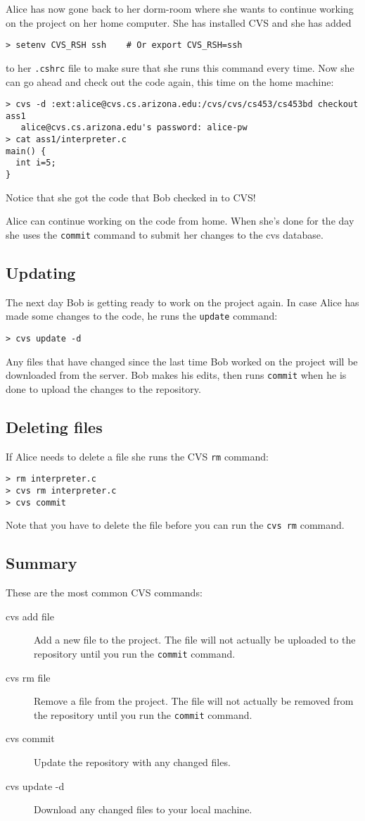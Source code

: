 Alice has now gone back to her dorm-room where she wants to
continue working on the project on her home computer. She
has installed CVS and she has added
\begin{verbatim}
> setenv CVS_RSH ssh    # Or export CVS_RSH=ssh
\end{verbatim}
to her {\tt .cshrc} file to make sure that she runs
this command every time. Now she can go ahead and
check out the code again, this time on the home 
machine: 
\begin{verbatim}
> cvs -d :ext:alice@cvs.cs.arizona.edu:/cvs/cvs/cs453/cs453bd checkout ass1
   alice@cvs.cs.arizona.edu's password: alice-pw
> cat ass1/interpreter.c 
main() { 
  int i=5;
}
\end{verbatim}
Notice that she got the code that Bob checked in to CVS!

Alice can continue working on the code from home. When
she's done for the day she uses the {\tt commit} command
to submit her changes to the cvs database. 

\subsection{Updating}
The next day Bob is getting ready to work on the project again.
In case Alice has made some changes to the code, he runs
the {\tt update} command:
\begin{verbatim}
> cvs update -d
\end{verbatim}
Any files that have changed since the last time Bob worked
on the project will be downloaded from the server. Bob
makes his edits, then runs {\tt commit} when he is done to
upload the changes to the repository.

\subsection{Deleting files}
If Alice needs to delete a file she runs the CVS {\tt rm} command:
\begin{verbatim}
> rm interpreter.c
> cvs rm interpreter.c
> cvs commit
\end{verbatim}
Note that you have to delete the file before you can run the
{\tt cvs rm} command.

\subsection{Summary}
These are the most common CVS commands:
\begin{description}
   \item[cvs add file] Add a new file to the project.
         The file will not actually be uploaded to the
         repository until you run the {\tt commit} command.
   \item[cvs rm file] Remove a file from the project.
         The file will not actually be removed from the
         repository until you run the {\tt commit} command.
   \item[cvs commit] Update the repository with any changed
         files.
   \item[cvs update -d] Download any changed files to your
        local machine.
\end{description}

